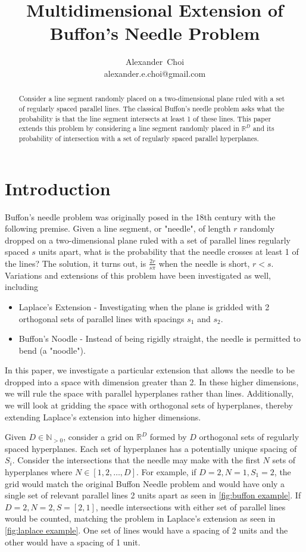 \documentclass{article}
\title{Multidimensional Extension of Buffon's Needle Problem}
\author{ Alexander~Choi\\
	alexander.e.choi@gmail.com
}
\begin{document}
\maketitle

\begin{abstract}
	Consider a line segment randomly placed on a two-dimensional plane ruled with a set of regularly spaced parallel lines. The classical Buffon's needle problem
    asks what the probability is that the line segment intersects at least 1 of these lines. This paper extends this problem by considering a line segment randomly
    placed in $\mathbb{R}^D$ and its probability of intersection with a set of regularly spaced parallel hyperplanes. 
\end{abstract}



\section{Introduction}
Buffon's needle problem was originally posed in the 18th century with the following premise. Given a line segment, or "needle", of length $r$ randomly dropped on a two-dimensional plane
ruled with a set of parallel lines regularly spaced $s$ units apart, what is the probability that the needle crosses at least 1 of the lines? The solution, it turns out, is
$\frac{2r}{s\pi}$ when the needle is short, $r<s$. Variations and extensions of this problem have been investigated as well, including
\begin{itemize}
	\item Laplace's Extension - Investigating when the plane is gridded with 2 orthogonal sets of parallel lines with spacings $s_1$ and $s_2$.
	\item Buffon's Noodle - Instead of being rigidly straight, the needle is permitted to bend (a "noodle").
\end{itemize}

In this paper, we investigate a particular extension that allows the needle to be dropped into a space with dimension greater than 2. In these higher dimensions, we will rule the space
with parallel hyperplanes rather than lines. Additionally, we will look at gridding the space with orthogonal sets of hyperplanes, thereby extending Laplace's extension into higher dimensions.

Given $D\in\mathbb{N}_{>0}$, consider a grid on $\mathbb{R}^D$ formed by $D$ orthogonal sets of regularly spaced hyperplanes. Each set of hyperplanes
has a potentially unique spacing of $S_i$. Consider the intersections that the needle may make
with the first $N$ sets of hyperplanes where $N\in[1,2,\dots,D]$. For example, if $D=2, N=1, S_1=2$, the
grid would match the original Buffon Needle problem and would have only a single set of relevant parallel lines 2
units apart as seen in \ref{fig:buffon example}. If $D=2, N=2, S=[2, 1]$, needle intersections with either
set of parallel lines would be counted, matching the problem in Laplace's extension as seen in 
\ref{fig:laplace example}. One set of lines would have a spacing of 2 units and the other would have a 
spacing of 1 unit.
\end{document}
